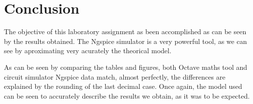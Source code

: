 \section{Conclusion}
\label{sec:conclusion}

\tab The objective of this laboratory assignment as been accomplished as can be seen by the results obtained. The Ngspice simulator is a very powerful tool, as we can see by aproximating very acurately the theorical model.\par
As can be seen by comparing the tables and figures, both Octave maths tool and circuit simulator Ngspice data match, almost perfectly, the differences are explained by the rounding of the last decimal case. Once again, the model used can be seen to accurately describe the results we obtain, as it was to be expected.
